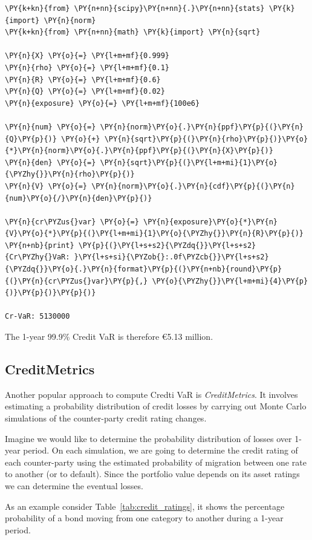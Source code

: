 \begin{codebox}
\begin{Verbatim}[commandchars=\\\{\}]
\PY{k+kn}{from} \PY{n+nn}{scipy}\PY{n+nn}{.}\PY{n+nn}{stats} \PY{k}{import} \PY{n}{norm}
\PY{k+kn}{from} \PY{n+nn}{math} \PY{k}{import} \PY{n}{sqrt}
		
\PY{n}{X} \PY{o}{=} \PY{l+m+mf}{0.999}
\PY{n}{rho} \PY{o}{=} \PY{l+m+mf}{0.1}
\PY{n}{R} \PY{o}{=} \PY{l+m+mf}{0.6}
\PY{n}{Q} \PY{o}{=} \PY{l+m+mf}{0.02}
\PY{n}{exposure} \PY{o}{=} \PY{l+m+mf}{100e6}
		
\PY{n}{num} \PY{o}{=} \PY{n}{norm}\PY{o}{.}\PY{n}{ppf}\PY{p}{(}\PY{n}{Q}\PY{p}{)} \PY{o}{+} \PY{n}{sqrt}\PY{p}{(}\PY{n}{rho}\PY{p}{)}\PY{o}{*}\PY{n}{norm}\PY{o}{.}\PY{n}{ppf}\PY{p}{(}\PY{n}{X}\PY{p}{)}
\PY{n}{den} \PY{o}{=} \PY{n}{sqrt}\PY{p}{(}\PY{l+m+mi}{1}\PY{o}{\PYZhy{}}\PY{n}{rho}\PY{p}{)}
\PY{n}{V} \PY{o}{=} \PY{n}{norm}\PY{o}{.}\PY{n}{cdf}\PY{p}{(}\PY{n}{num}\PY{o}{/}\PY{n}{den}\PY{p}{)}
		
\PY{n}{cr\PYZus{}var} \PY{o}{=} \PY{n}{exposure}\PY{o}{*}\PY{n}{V}\PY{o}{*}\PY{p}{(}\PY{l+m+mi}{1}\PY{o}{\PYZhy{}}\PY{n}{R}\PY{p}{)}
\PY{n+nb}{print} \PY{p}{(}\PY{l+s+s2}{\PYZdq{}}\PY{l+s+s2}{Cr\PYZhy{}VaR: }\PY{l+s+si}{\PYZob{}:.0f\PYZcb{}}\PY{l+s+s2}{\PYZdq{}}\PY{o}{.}\PY{n}{format}\PY{p}{(}\PY{n+nb}{round}\PY{p}{(}\PY{n}{cr\PYZus{}var}\PY{p}{,} \PY{o}{\PYZhy{}}\PY{l+m+mi}{4}\PY{p}{)}\PY{p}{)}\PY{p}{)}

Cr-VaR: 5130000
\end{Verbatim}
\end{codebox}
\noindent
The 1-year 99.9\% Credit VaR is therefore \euro{5.13} million.

\subsection{CreditMetrics}
Another popular approach to compute Credti VaR is \emph{CreditMetrics}. It involves estimating a probability distribution of credit losses by carrying out Monte Carlo simulations of the counter-party credit rating changes.

Imagine we would like to determine the probability distribution of losses over 1-year period. On each simulation, we are going to determine the credit rating of each counter-party using the estimated probability of migration between one rate to another (or to default). Since the portfolio value depends on its asset ratings we can determine the eventual losses. 

As an example consider Table~\ref{tab:credit_ratings}, it shows the percentage probability of a bond moving from one category to another during a 1-year period.

